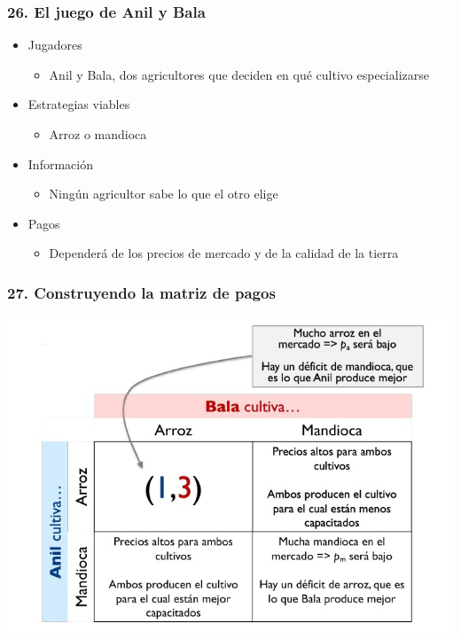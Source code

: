 \documentclass[14pt]{beamer}
\begin{document}
\begin{frame}
\frametitle{26. El juego de Anil y Bala}
\begin{itemize}
    \item Jugadores
        \begin{itemize}
        \item Anil y Bala, dos agricultores que deciden en qué cultivo especializarse
        \end{itemize}
    \item Estrategias viables
        \begin{itemize}
        \item Arroz o mandioca
        \end{itemize}
    \item Información
        \begin{itemize}
        \item Ningún agricultor sabe lo que el otro elige
        \end{itemize}
    \item Pagos
        \begin{itemize}
        \item Dependerá de los precios de mercado y de la calidad de la tierra
        \end{itemize}
\end{itemize}
\end{frame}

\begin{frame}
\frametitle{27. Construyendo la matriz de pagos}
\centering
\includegraphics[scale=0.6]{Figures/Tema_03_8_bala.jpg}
\end{frame}
\end{document}
